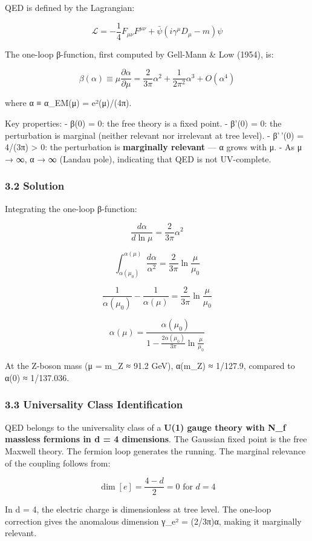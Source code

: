 \documentclass[
]{article}
\begin{document}
QED is defined by the Lagrangian:

\[\mathcal{L} = -\frac{1}{4}F_{\mu\nu}F^{\mu\nu} + \bar{\psi}(i\gamma^\mu D_\mu - m)\psi\]

The one-loop β-function, first computed by Gell-Mann \& Low (1954), is:

\[\beta(\alpha) \equiv \mu\frac{\partial\alpha}{\partial\mu} = \frac{2}{3\pi}\alpha^2 + \frac{1}{2\pi^2}\alpha^3 + O(\alpha^4)\]

where α ≡ α\_EM(μ) = e²(μ)/(4π).

Key properties: - β(0) = 0: the free theory is a fixed point. - β'(0) =
0: the perturbation is marginal (neither relevant nor irrelevant at tree
level). - β'\,'(0) = 4/(3π) \textgreater{} 0: the perturbation is
\textbf{marginally relevant} --- α grows with μ. - As μ → ∞, α → ∞
(Landau pole), indicating that QED is not UV-complete.

\subsubsection{3.2 Solution}\label{solution}

Integrating the one-loop β-function:

\[\frac{d\alpha}{d\ln\mu} = \frac{2}{3\pi}\alpha^2\]

\[\int_{\alpha(\mu_0)}^{\alpha(\mu)} \frac{d\alpha}{\alpha^2} = \frac{2}{3\pi}\ln\frac{\mu}{\mu_0}\]

\[\frac{1}{\alpha(\mu_0)} - \frac{1}{\alpha(\mu)} = \frac{2}{3\pi}\ln\frac{\mu}{\mu_0}\]

\[\alpha(\mu) = \frac{\alpha(\mu_0)}{1 - \frac{2\alpha(\mu_0)}{3\pi}\ln\frac{\mu}{\mu_0}}\]

At the Z-boson mass (μ = m\_Z ≈ 91.2 GeV), α(m\_Z) ≈ 1/127.9, compared
to α(0) ≈ 1/137.036.

\subsubsection{3.3 Universality Class
Identification}\label{universality-class-identification}

QED belongs to the universality class of a \textbf{U(1) gauge theory
with N\_f massless fermions in d = 4 dimensions}. The Gaussian fixed
point is the free Maxwell theory. The fermion loop generates the
running. The marginal relevance of the coupling follows from:

\[\dim[e] = \frac{4-d}{2} = 0 \text{ for } d=4\]

In d = 4, the electric charge is dimensionless at tree level. The
one-loop correction gives the anomalous dimension γ\_e² = (2/3π)α,
making it marginally relevant.
\end{document}

